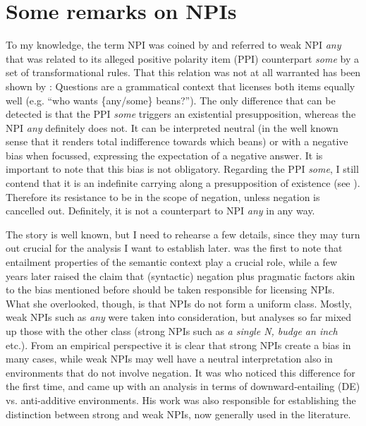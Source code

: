 \documentclass[output=paper,colorlinks,citecolor=brown,
]{langscibook}
\begin{document}
\section{Some remarks on NPIs}

To my knowledge, the term NPI was coined by \citet{klima1964} and referred to weak NPI \textit{any} that was related to
its alleged positive polarity item (PPI) counterpart \textit{some} by a set of transformational rules. That this
relation was not at all warranted has been shown by \citet{lakoffrob1969}: Questions are a grammatical context that
licenses both items equally well (e.g. ``who wants \{any/some\} beans?''). The only difference that can be detected is
that the PPI \textit{some} triggers an existential presupposition, whereas the NPI \textit{any} definitely does not. It
can be interpreted neutral (in the well known sense that it renders total indifference towards which beans) or with a
negative bias when focussed, expressing the expectation of a negative answer. It is important to note that this bias is not
obligatory. Regarding the PPI \textit{some}, I still contend that it is an indefinite carrying along a presupposition
of existence (see \citet{neubarth2006}). Therefore its resistance to be in the scope of negation, unless negation
is cancelled out. Definitely, it is not a counterpart to NPI \textit{any} in any way.

The story is well known, but I need to rehearse a few details, since they may turn out crucial for the analysis I want
to establish later. \citet{ladusaw1979} was the first to note that entailment properties of the semantic context play a
crucial role, while a few years later \citet{linebarger1987} raised the claim that (syntactic) negation plus pragmatic
factors akin to the bias mentioned before should be taken responsible for licensing NPIs. What she overlooked, though,
is that NPIs do not form a uniform class. Mostly, weak NPIs such as \textit{any} were taken into consideration, but
analyses so far mixed up those with the other class (strong NPIs such as \textit{a single N, budge an inch} etc.). From
an empirical perspective it is clear that strong NPIs create a bias in many cases, while weak NPIs may well have a
neutral interpretation also in environments that do not involve negation. It was \citet{heim1984} who noticed this
difference for the first time, and \citet{zwarts1990, zwarts1998} came up with an analysis in terms of
downward-entailing (DE) vs. anti-additive environments. His work was also responsible for establishing the distinction
between strong and weak NPIs, now generally used in the literature.
\end{document}
